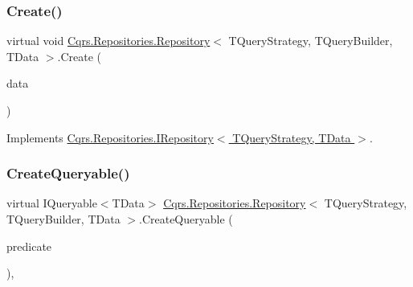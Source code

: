 \mbox{\label{classCqrs_1_1Repositories_1_1Repository_a2af8103cc2946317f8ee9ede643bbc68_a2af8103cc2946317f8ee9ede643bbc68}} 
\subsubsection{\texorpdfstring{Create()}{Create()}\hspace{0.1cm}{\footnotesize\ttfamily [2/2]}}
{\footnotesize\ttfamily virtual void \hyperlink{classCqrs_1_1Repositories_1_1Repository}{Cqrs.\+Repositories.\+Repository}$<$ T\+Query\+Strategy, T\+Query\+Builder, T\+Data $>$.Create (\begin{DoxyParamCaption}\item[{I\+Enumerable$<$ T\+Data $>$}]{data }\end{DoxyParamCaption})\hspace{0.3cm}{\ttfamily [virtual]}}



Implements \hyperlink{interfaceCqrs_1_1Repositories_1_1IRepository_ae3481fb2ecb0146308e07a9dd6af8c14_ae3481fb2ecb0146308e07a9dd6af8c14}{Cqrs.\+Repositories.\+I\+Repository$<$ T\+Query\+Strategy, T\+Data $>$}.

\mbox{\label{classCqrs_1_1Repositories_1_1Repository_ab95fc66b24e8359a1e2f48a3ca2f14c1_ab95fc66b24e8359a1e2f48a3ca2f14c1}} 
\subsubsection{\texorpdfstring{Create\+Queryable()}{CreateQueryable()}}
{\footnotesize\ttfamily virtual I\+Queryable$<$T\+Data$>$ \hyperlink{classCqrs_1_1Repositories_1_1Repository}{Cqrs.\+Repositories.\+Repository}$<$ T\+Query\+Strategy, T\+Query\+Builder, T\+Data $>$.Create\+Queryable (\begin{DoxyParamCaption}\item[{Expression$<$ Func$<$ T\+Data, bool $>$$>$}]{predicate }\end{DoxyParamCaption})\hspace{0.3cm}{\ttfamily [protected]}, {\ttfamily [virtual]}}



